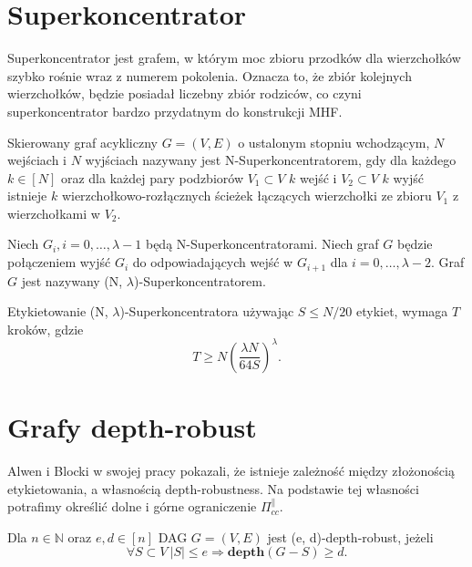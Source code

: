\section{Superkoncentrator}
Superkoncentrator jest grafem, w którym moc zbioru przodków dla wierzchołków szybko rośnie wraz z numerem pokolenia. Oznacza to, że zbiór kolejnych wierzchołków, będzie posiadał liczebny zbiór rodziców, co czyni superkoncentrator bardzo przydatnym do konstrukcji MHF.
\begin{definition}[N-Superkoncentrator] Skierowany graf acykliczny $G = (V, E)$ o ustalonym stopniu wchodzącym, $N$ wejściach i
	$N$ wyjściach nazywany jest N-Superkoncentratorem, gdy dla każdego $k \in [N]$
	oraz dla każdej pary podzbiorów $V_{1} \subset V$ $k$ wejść i $V_{2} \subset V$ $k$ wyjść istnieje
	$k$ wierzchołkowo-rozłącznych ścieżek łączących wierzchołki ze zbioru $V_{1}$ z wierzchołkami w $V_{2}$.
\end{definition}

\begin{definition} Niech $G_{i}, i = 0, \dots, \lambda-1$ będą N-Superkoncentratorami.
	Niech graf $G$ będzie połączeniem wyjść $G_{i}$ do odpowiadających wejść w $G_{i+1}$ dla $i = 0, \dots, \lambda - 2$.
	Graf $G$ jest nazywany (N, $\lambda$)-Superkoncentratorem.
\end{definition}

\begin{lemma} \cite[Lemat 1]{rs}
	Etykietowanie (N, $\lambda$)-Superkoncentratora używając $S \leq N/20$ etykiet, wymaga $T$ kroków, gdzie
	$$ T \geq N \left( \frac{ \lambda N}{64 S} \right) ^{ \lambda }.$$
\end{lemma}

\section{Grafy depth-robust}

Alwen i Blocki w swojej pracy \cite{depth}
pokazali, że istnieje zależność między złożonością etykietowania, a własnością depth-robustness. Na podstawie tej własności potrafimy określić dolne i górne ograniczenie $\Pi_{ cc }^{ \parallel }$.

\begin{definition} Dla $n \in \mathbb{N}$ oraz $e, d \in [n]$ DAG $G = (V, E)$
	jest (e, d)-depth-robust, jeżeli
	$$ \forall S \subset V \ | S | \leq e \Rightarrow \mathbf{depth}(G - S) \geq d.$$
\end{definition}

